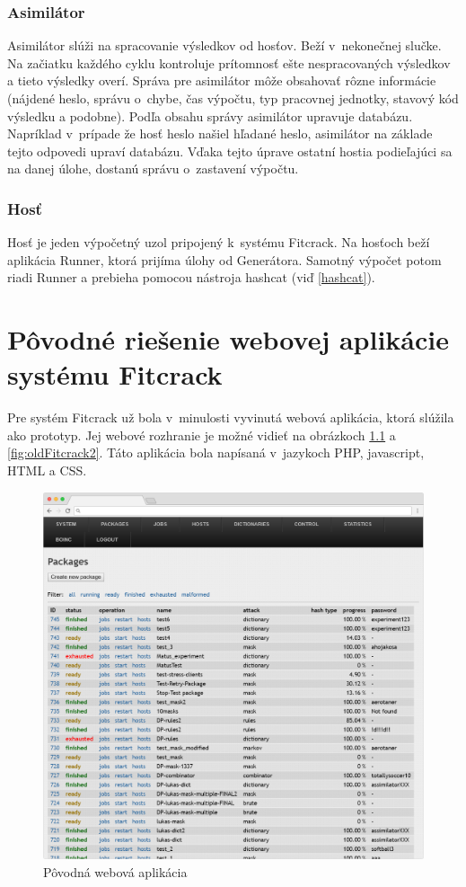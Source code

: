 \documentclass[slovak]{fitthesis}
\begin{document}
\subsection{Asimilátor}
\label{asimilator}
Asimilátor slúži na spracovanie výsledkov od hosťov. Beží v~nekonečnej slučke. Na začiatku každého cyklu kontroluje prítomnosť ešte nespracovaných výsledkov a tieto výsledky overí. Správa pre asimilátor môže obsahovať rôzne informácie (nájdené heslo, správu o~chybe, čas výpočtu, typ pracovnej jednotky, stavový kód výsledku a podobne). Podľa obsahu správy asimilátor upravuje databázu. Napríklad v~prípade že hosť heslo našiel hľadané heslo, asimilátor na základe tejto odpovedi upraví databázu. Vďaka tejto úprave ostatní hostia podieľajúci sa na danej úlohe, dostanú správu o~zastavení výpočtu.

\subsection{Hosť}
Hosť je jeden výpočetný uzol pripojený k~systému Fitcrack. Na hosťoch beží aplikácia Runner, ktorá prijíma úlohy od Generátora. Samotný výpočet potom riadi Runner a prebieha pomocou nástroja hashcat (viď \ref{hashcat}).



\chapter{Pôvodné riešenie webovej aplikácie systému Fitcrack}
Pre systém Fitcrack už bola v~minulosti vyvinutá webová aplikácia, ktorá slúžila ako prototyp. Jej webové rozhranie je možné vidieť na obrázkoch \ref{fig:oldFitcrack} a  \ref{fig:oldFitcrack2}. Táto aplikácia bola napísaná v~jazykoch PHP, javascript, HTML a CSS.
\begin{figure}[H]
    \centering
    \includegraphics[scale=0.3]{obrazky/oldWebadminFrame.PNG}
    \caption{Pôvodná webová aplikácia}
    \label{fig:oldFitcrack}
\end{figure}
\end{document}
